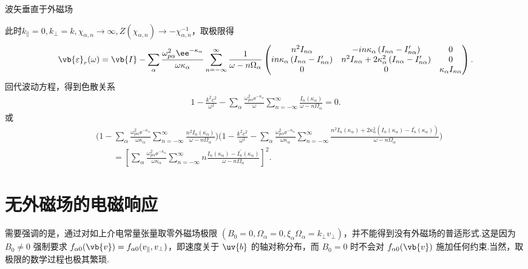 \begin{exbox}
	波矢垂直于外磁场

	此时\(k_{\parallel}=0, k_\perp=k, \chi_{\alpha,n}\to\infty, Z(\chi_{\alpha,n})\to-\chi_{\alpha,n}^{-1}\)，取极限得
	\begin{align*}
		\vb{\varepsilon}_r(\omega) = \vb{I} - \sum_\alpha\frac{\omega_{p\alpha}^2\ee^{-\kappa_\alpha}}{\omega\kappa_\alpha}
		\sum_{n=-\infty}^{\infty}\frac{1}{\omega-n\Omega_\alpha}
		\begin{pmatrix}
			n^2I_{n\alpha}                                             & -in\kappa_\alpha\left(I_{n\alpha}-I_{n\alpha}^\prime\right)                & 0                         \\
			in\kappa_\alpha\left(I_{n\alpha}-I_{n\alpha}^\prime\right) & n^2I_{n\alpha}+2\kappa_\alpha^2\left(I_{n\alpha}-I_{n\alpha}^\prime\right) & 0                         \\
			0                                                          & 0                                                                          & \kappa_\alpha I_{n\alpha}
		\end{pmatrix}.
	\end{align*}
	回代波动方程，得到色散关系
	\begin{align*}
		1 - \frac{k^2c^2}{\omega^2} - \sum_\alpha\frac{\omega_{p\alpha}^2\ee^{-\kappa_\alpha}}{\omega}\sum_{n=-\infty}^{\infty}\frac{I_n(\kappa_\alpha)}{\omega-n\Omega_\alpha} = 0.
	\end{align*}
	或
	\begin{align*}
		&\Bigg(1 - \sum_\alpha\frac{\omega_{p\alpha}^2\ee^{-\kappa_\alpha}}{\omega\kappa_\alpha}\sum_{n=-\infty}^{\infty}\frac{n^2I_n(\kappa_\alpha)}{\omega-n\Omega_\alpha}\Bigg)
		\Bigg(1 - \frac{k^2c^2}{\omega^2} - \sum_\alpha\frac{\omega_{p\alpha}^2\ee^{-\kappa_\alpha}}{\omega\kappa_\alpha}\sum_{n=-\infty}^{\infty}\frac{n^2I_n(\kappa_\alpha)+2\kappa_\alpha^2\left(I_n(\kappa_\alpha)-I_n^\prime(\kappa_\alpha)\right)}{\omega-n\Omega_\alpha}\Bigg)\\
		&\qquad= \left[\sum_\alpha\frac{\omega_{p\alpha}^2\ee^{-\kappa_\alpha}}{\omega\kappa_\alpha}\sum_{n=-\infty}^{\infty}n\frac{I_n(\kappa_\alpha)-I_n^\prime(\kappa_\alpha)}{\omega-n\Omega_\alpha}\right]^2.
	\end{align*}
\end{exbox}

\section{无外磁场的电磁响应}
需要强调的是，通过对如上介电常量张量取零外磁场极限 \(\left(B_0=0,\Omega_\alpha=0,\xi_\alpha\Omega_\alpha=k_\perp v_\perp\right)\)，并不能得到没有外磁场的普适形式.这是因为 \(B_0\neq0\) 强制要求 \(f_{\alpha0}(\vb{v})=f_{\alpha0}(v_{\parallel},v_\perp)\)，即速度关于 \(\uv{b}\) 的轴对称分布，而 \(B_0=0\) 时不会对 \(f_{\alpha0}(\vb{v})\) 施加任何约束.当然，取极限的数学过程也极其繁琐.

